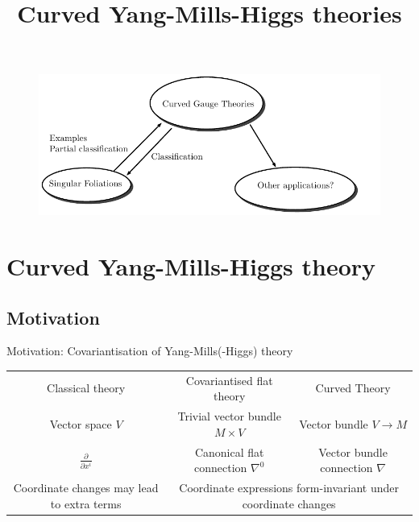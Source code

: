 \documentclass[
aspectratio=3218, 
10pt, hyperref={pdfpagelabels=false}]{beamer}
\title{Curved Yang-Mills-Higgs theories}
\subtitle{}
\author{Simon-Raphael Fischer, \textit{based on joint works with Camille Laurent-Gengoux, and with Mehran Jalali Farahani, Hyungrok Kim (\begin{CJK*}{UTF8}{bkai}金炯錄\end{CJK*}), Christian Sämann}}
\institute{
\begin{figure}
	\centering
		\texttt{[image: Logo\_Uni\_Göttingen\_2022.png]}
	\label{fig:NCTS}
\end{figure}
\begin{center}
\end{center}
}
\date{}
\theoremstyle{plain}
\theoremstyle{remark}
\begin{document}
\begin{frame}
\thispagestyle{empty}
\titlepage
\end{frame} 


{
\begin{frame}
\thispagestyle{empty}
\begin{figure}[htbp]
	\centering
		\includegraphics[width=1\textwidth]{Research circles I.pdf}
\end{figure}
\end{frame} 
}

\section{Curved Yang-Mills-Higgs theory}

\subsection{Motivation}



\begin{frame}{Motivation: Covariantisation of Yang-Mills(-Higgs) theory}
{\renewcommand{\arraystretch}{2}
\begin{table}[h!]
		\begin{tabularx}{\textwidth}{c c c}
			\rowcolor{gray}
			Classical theory & Covariantised flat theory & Curved Theory \\
			Vector space $V$ & Trivial vector bundle $M \times V$ & Vector bundle $V \to M$ \\
			\rowcolor{Gray}
			$\frac{\partial}{\partial x^i}$ & Canonical flat connection $\nabla^0$ & Vector bundle connection $\nabla$ \\ 
			\multicolumn{1}{X}{Coordinate changes may lead to extra terms} & 
			\multicolumn{2}{c}{Coordinate expressions form-invariant under coordinate changes}
		\end{tabularx}
\end{table}}

\end{frame}
\end{document}
